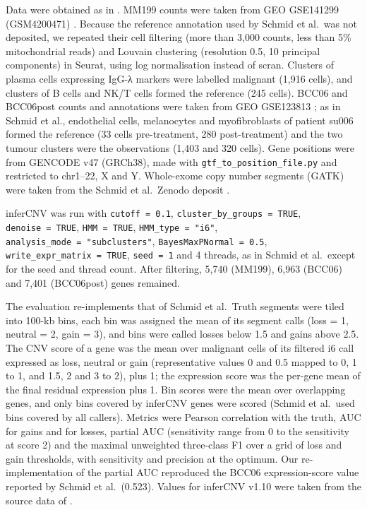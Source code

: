 Data were obtained as in \citet{schmid2025}. MM199 counts were taken from GEO GSE141299 (GSM4200471) \citep{mahdipourshirayeh2022scicnv}. Because the reference annotation used by Schmid et al.~was not deposited, we repeated their cell filtering (more than 3,000 counts, less than 5\% mitochondrial reads) and Louvain clustering (resolution 0.5, 10 principal components) in Seurat, using log normalisation instead of scran. Clusters of plasma cells expressing IgG-λ markers were labelled malignant (1,916 cells), and clusters of B cells and NK/T cells formed the reference (245 cells). BCC06 and BCC06post counts and annotations were taken from GEO GSE123813 \citep{yost2019}; as in Schmid et al., endothelial cells, melanocytes and myofibroblasts of patient su006 formed the reference (33 cells pre-treatment, 280 post-treatment) and the two tumour clusters were the observations (1,403 and 320 cells). Gene positions were from GENCODE v47 (GRCh38), made with \texttt{gtf\_to\_position\_file.py} and restricted to chr1--22, X and Y. Whole-exome copy number segments (GATK) were taken from the Schmid et al.~Zenodo deposit \citep{schmid2025zenodoTruth}.

inferCNV was run with \texttt{cutoff\ =\ 0.1}, \texttt{cluster\_by\_groups\ =\ TRUE}, \texttt{denoise\ =\ TRUE}, \texttt{HMM\ =\ TRUE}, \texttt{HMM\_type\ =\ "i6"}, \texttt{analysis\_mode\ =\ "subclusters"}, \texttt{BayesMaxPNormal\ =\ 0.5}, \texttt{write\_expr\_matrix\ =\ TRUE}, \texttt{seed\ =\ 1} and 4 threads, as in Schmid et al.~except for the seed and thread count. After filtering, 5,740 (MM199), 6,963 (BCC06) and 7,401 (BCC06post) genes remained.

The evaluation re-implements that of Schmid et al.~Truth segments were tiled into 100-kb bins, each bin was assigned the mean of its segment calls (loss = 1, neutral = 2, gain = 3), and bins were called losses below 1.5 and gains above 2.5. The CNV score of a gene was the mean over malignant cells of its filtered i6 call expressed as loss, neutral or gain (representative values 0 and 0.5 mapped to 0, 1 to 1, and 1.5, 2 and 3 to 2), plus 1; the expression score was the per-gene mean of the final residual expression plus 1. Bin scores were the mean over overlapping genes, and only bins covered by inferCNV genes were scored (Schmid et al.~used bins covered by all callers). Metrics were Pearson correlation with the truth, AUC for gains and for losses, partial AUC (sensitivity range from 0 to the sensitivity at score 2) and the maximal unweighted three-class F1 over a grid of loss and gain thresholds, with sensitivity and precision at the optimum. Our re-implementation of the partial AUC reproduced the BCC06 expression-score value reported by Schmid et al.~(0.523). Values for inferCNV v1.10 were taken from the source data of \citet{schmid2025}.

